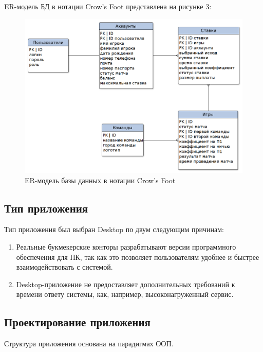 \newpage

ER-модель БД в нотации Crow’s Foot представлена на рисунке 3:
\FloatBarrier
\begin{figure}[h]	
	\begin{center}
		\includegraphics[width=\linewidth]{inc/scheme.png}
	\end{center}
	\caption{ER-модель базы данных в нотации Crow’s Foot}
	\label{fig::scheme}
\end{figure}
\FloatBarrier

\subsection{Тип приложения}
Тип приложения был выбран Desktop по двум следующим причинам:
\begin{enumerate}
	\item Реальные букмекерские конторы разрабатывают версии программного обеспечения для ПК, так как это позволяет пользователям удобнее и быстрее взаимодействовать с системой.
	\item Desktop-приложение не предоставляет дополнительных требований к времени ответу системы, как, например, высоконагруженный сервис. 
\end{enumerate}

\subsection{Проектирование приложения}
Структура приложения основана на парадигмах ООП. 

